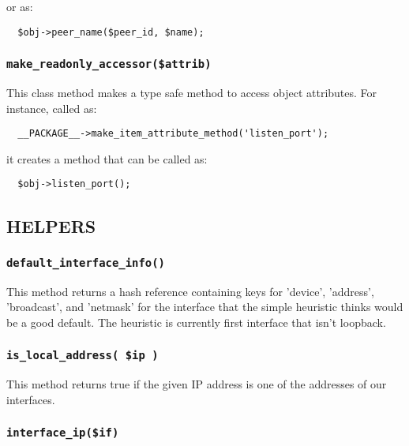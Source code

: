 or as:

\begin{verbatim}
  $obj->peer_name($peer_id, $name);
\end{verbatim}
\subsubsection*{\texttt{make\_readonly\_accessor(\$attrib)}\label{xPL::Base_make_readonly_accessor_attrib_}}


This class method makes a type safe method to access object attributes.
For instance, called as:

\begin{verbatim}
  __PACKAGE__->make_item_attribute_method('listen_port');
\end{verbatim}


it creates a method that can be called as:

\begin{verbatim}
  $obj->listen_port();
\end{verbatim}
\subsection*{HELPERS\label{xPL::Base_HELPERS}}
\subsubsection*{\texttt{default\_interface\_info()}\label{xPL::Base_default_interface_info_}}


This method returns a hash reference containing keys for 'device',
'address', 'broadcast', and 'netmask' for the interface that the
simple heuristic thinks would be a good default.  The heuristic
is currently first interface that isn't loopback.

\subsubsection*{\texttt{is\_local\_address( \$ip )}\label{xPL::Base_is_local_address_ip_}}


This method returns true if the given IP address is one of the
addresses of our interfaces.

\subsubsection*{\texttt{interface\_ip(\$if)}\label{xPL::Base_interface_ip_if_}}


